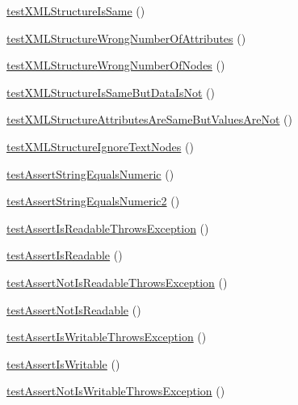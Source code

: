 \begin{DoxyCompactItemize}
\item 
\mbox{\hyperlink{class_framework___assert_test_abc2d7574f051b50b2ef949e5a1afa5ff}{test\+X\+M\+L\+Structure\+Is\+Same}} ()
\item 
\mbox{\hyperlink{class_framework___assert_test_a8bc906f00682fe0dad4a7d849c29b76d}{test\+X\+M\+L\+Structure\+Wrong\+Number\+Of\+Attributes}} ()
\item 
\mbox{\hyperlink{class_framework___assert_test_a4b819d3bae77f889d2d45dd4d960c4c9}{test\+X\+M\+L\+Structure\+Wrong\+Number\+Of\+Nodes}} ()
\item 
\mbox{\hyperlink{class_framework___assert_test_a1b2f4dbc02e9908b0e8442d316e912b0}{test\+X\+M\+L\+Structure\+Is\+Same\+But\+Data\+Is\+Not}} ()
\item 
\mbox{\hyperlink{class_framework___assert_test_a3c85a89d6e72dc668e4885ae8c5aae2e}{test\+X\+M\+L\+Structure\+Attributes\+Are\+Same\+But\+Values\+Are\+Not}} ()
\item 
\mbox{\hyperlink{class_framework___assert_test_aa1c405dc53c006c913ff41143b12d942}{test\+X\+M\+L\+Structure\+Ignore\+Text\+Nodes}} ()
\item 
\mbox{\hyperlink{class_framework___assert_test_a15d37e71120a4589d4bbb916a1a140ed}{test\+Assert\+String\+Equals\+Numeric}} ()
\item 
\mbox{\hyperlink{class_framework___assert_test_a8111f26592ce76f1b9aec42034cd3167}{test\+Assert\+String\+Equals\+Numeric2}} ()
\item 
\mbox{\hyperlink{class_framework___assert_test_af9461d3fbe3749d9543c7110c86706d0}{test\+Assert\+Is\+Readable\+Throws\+Exception}} ()
\item 
\mbox{\hyperlink{class_framework___assert_test_acd52b896d004f3ca548a7f576e32fabc}{test\+Assert\+Is\+Readable}} ()
\item 
\mbox{\hyperlink{class_framework___assert_test_a636fb8cdf711d27f956d2c572776161a}{test\+Assert\+Not\+Is\+Readable\+Throws\+Exception}} ()
\item 
\mbox{\hyperlink{class_framework___assert_test_a9782bd7afcc5f19d2621aafe942559b4}{test\+Assert\+Not\+Is\+Readable}} ()
\item 
\mbox{\hyperlink{class_framework___assert_test_addaad4ec6eff89de521fbbd98e57b4d6}{test\+Assert\+Is\+Writable\+Throws\+Exception}} ()
\item 
\mbox{\hyperlink{class_framework___assert_test_ab7969fbe6025f5b15f8a59897416a154}{test\+Assert\+Is\+Writable}} ()
\item 
\mbox{\hyperlink{class_framework___assert_test_a271375e87a37b1a651d848038f1cd674}{test\+Assert\+Not\+Is\+Writable\+Throws\+Exception}} ()

\end{DoxyCompactItemize}
